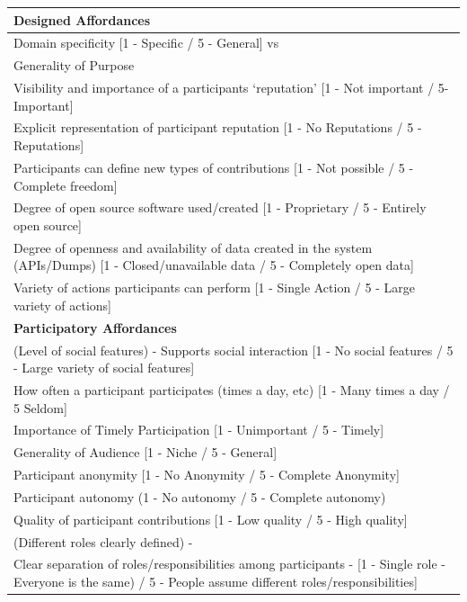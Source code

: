 \documentclass{sig-alternate}
\begin{document}
\begin{table}[htbp]
\begin{center}
\begin{tabular}{|p{18cm}|}
\hline
{\bf Designed Affordances} \\
\hline
Domain specificity [1 - Specific / 5 - General] vs \\
\hspace{0.66cm} Generality of Purpose \\
Visibility and importance of a participants `reputation' [1 - Not important / 5- Important] \\
\hspace{0.66cm} Explicit representation of participant reputation [1 - No Reputations / 5 - Reputations] \\
Participants can define new types of contributions [1 - Not possible / 5 - Complete freedom] \\
Degree of open source software used/created [1 - Proprietary / 5 - Entirely open source] \\
Degree of openness and availability of data created in the system (APIs/Dumps) [1 - Closed/unavailable data / 5 - Completely open data] \\
Variety of actions participants can perform [1 - Single Action / 5 - Large variety of actions] \\
\hline
{\bf Participatory Affordances} \\
\hline
(Level of social features) - Supports social interaction [1 - No social features / 5 - Large variety of social features] \\
How often a participant participates (times a day, etc) [1 - Many times a day / 5 Seldom] \\
Importance of Timely Participation [1 - Unimportant / 5 - Timely] \\
Generality of Audience [1 - Niche / 5 - General] \\
Participant anonymity [1 - No Anonymity / 5 - Complete Anonymity] \\
Participant autonomy (1 - No autonomy / 5 - Complete autonomy) \\
Quality of participant contributions [1 - Low quality / 5 - High quality] \\
(Different roles clearly defined) - \\
\hspace{0.66cm} Clear separation of roles/responsibilities among participants - [1 - Single role - Everyone is the same) / 5 - People assume different roles/responsibilities] \\

\end{tabular}
\end{center}
\end{table}
\end{document}

